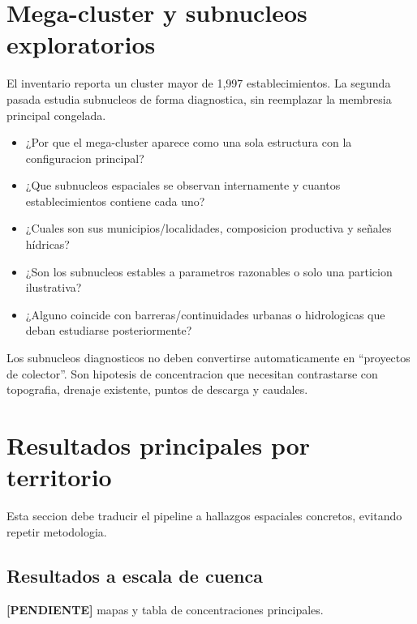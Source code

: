 \documentclass[11pt,letterpaper]{article}
\newcommand{\pendiente}{\textcolor{AtoyacRed}{\textbf{[PENDIENTE]}}}
\begin{document}
\section{Mega-cluster y subnucleos exploratorios}

\begin{hechos}
El inventario reporta un cluster mayor de 1,997 establecimientos. La segunda pasada estudia subnucleos de forma diagnostica, sin reemplazar la membresia principal congelada.
\end{hechos}

\begin{preguntas}
\begin{itemize}
    \item ¿Por que el mega-cluster aparece como una sola estructura con la configuracion principal?
    \item ¿Que subnucleos espaciales se observan internamente y cuantos establecimientos contiene cada uno?
    \item ¿Cuales son sus municipios/localidades, composicion productiva y señales hídricas?
    \item ¿Son los subnucleos estables a parametros razonables o solo una particion ilustrativa?
    \item ¿Alguno coincide con barreras/continuidades urbanas o hidrologicas que deban estudiarse posteriormente?
\end{itemize}
\end{preguntas}

\begin{alerta}
Los subnucleos diagnosticos no deben convertirse automaticamente en ``proyectos de colector''. Son hipotesis de concentracion que necesitan contrastarse con topografia, drenaje existente, puntos de descarga y caudales.
\end{alerta}

\section{Resultados principales por territorio}

Esta seccion debe traducir el pipeline a hallazgos espaciales concretos, evitando repetir metodologia.

\subsection{Resultados a escala de cuenca}
\pendiente\; mapas y tabla de concentraciones principales.
\end{document}
